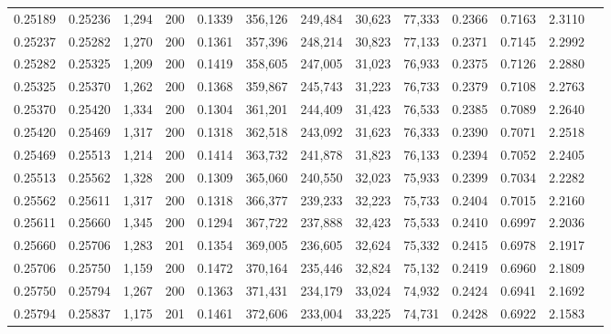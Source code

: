 \begin{tabular}{rrrrrrrrrrrrr}
0.25189 & 0.25236 & 1,294 & 200 &                                     0.1339 & 356,126 & 249,484 &  30,623 &  77,333 & 0.2366 & 0.7163 & 2.3110 \\
0.25237 & 0.25282 & 1,270 & 200 &                                     0.1361 & 357,396 & 248,214 &  30,823 &  77,133 & 0.2371 & 0.7145 & 2.2992 \\
0.25282 & 0.25325 & 1,209 & 200 &                                     0.1419 & 358,605 & 247,005 &  31,023 &  76,933 & 0.2375 & 0.7126 & 2.2880 \\
0.25325 & 0.25370 & 1,262 & 200 &                                     0.1368 & 359,867 & 245,743 &  31,223 &  76,733 & 0.2379 & 0.7108 & 2.2763 \\
0.25370 & 0.25420 & 1,334 & 200 &                                     0.1304 & 361,201 & 244,409 &  31,423 &  76,533 & 0.2385 & 0.7089 & 2.2640 \\
0.25420 & 0.25469 & 1,317 & 200 &                                     0.1318 & 362,518 & 243,092 &  31,623 &  76,333 & 0.2390 & 0.7071 & 2.2518 \\
0.25469 & 0.25513 & 1,214 & 200 &                                     0.1414 & 363,732 & 241,878 &  31,823 &  76,133 & 0.2394 & 0.7052 & 2.2405 \\
0.25513 & 0.25562 & 1,328 & 200 &                                     0.1309 & 365,060 & 240,550 &  32,023 &  75,933 & 0.2399 & 0.7034 & 2.2282 \\
0.25562 & 0.25611 & 1,317 & 200 &                                     0.1318 & 366,377 & 239,233 &  32,223 &  75,733 & 0.2404 & 0.7015 & 2.2160 \\
0.25611 & 0.25660 & 1,345 & 200 &                                     0.1294 & 367,722 & 237,888 &  32,423 &  75,533 & 0.2410 & 0.6997 & 2.2036 \\
0.25660 & 0.25706 & 1,283 & 201 &                                     0.1354 & 369,005 & 236,605 &  32,624 &  75,332 & 0.2415 & 0.6978 & 2.1917 \\
0.25706 & 0.25750 & 1,159 & 200 &                                     0.1472 & 370,164 & 235,446 &  32,824 &  75,132 & 0.2419 & 0.6960 & 2.1809 \\
0.25750 & 0.25794 & 1,267 & 200 &                                     0.1363 & 371,431 & 234,179 &  33,024 &  74,932 & 0.2424 & 0.6941 & 2.1692 \\
0.25794 & 0.25837 & 1,175 & 201 &                                     0.1461 & 372,606 & 233,004 &  33,225 &  74,731 & 0.2428 & 0.6922 & 2.1583 \\

\end{tabular}

